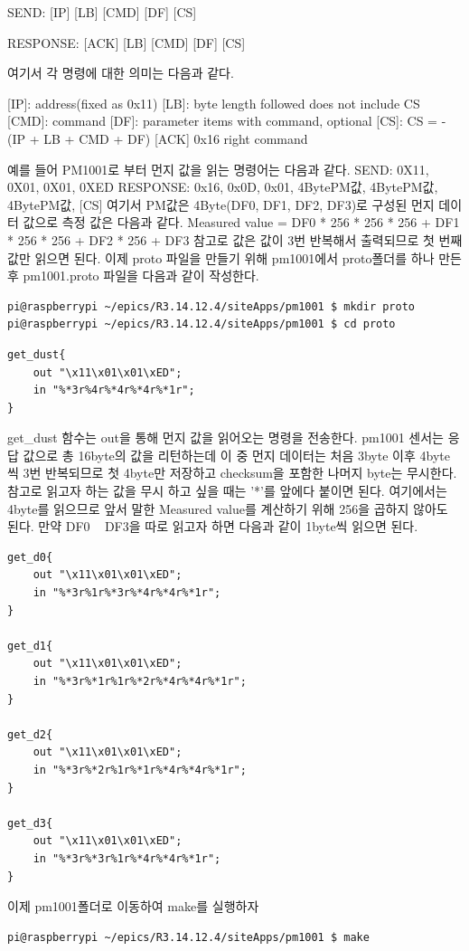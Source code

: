 \documentclass[11pt
  , a4paper
  , article
  , oneside
]{memoir}
\begin{document}
        SEND: [IP] [LB] [CMD] [DF] [CS]

        RESPONSE: [ACK] [LB] [CMD] [DF] [CS]

여기서 각 명령에 대한 의미는 다음과 같다.

        [IP]: address(fixed as 0x11)
        [LB]: byte length followed does not include CS
        [CMD]: command
        [DF]: parameter items with command, optional
        [CS]: CS = -(IP + LB + CMD + DF)
        [ACK] 0x16 right command

예를 들어 PM1001로 부터 먼지 값을 읽는 명령어는 다음과 같다.
        SEND: 0X11, 0X01, 0X01, 0XED
        RESPONSE: 0x16, 0x0D, 0x01, 4BytePM값, 4BytePM값, 4BytePM값, [CS]
여기서 PM값은 4Byte(DF0, DF1, DF2, DF3)로 구성된 먼지 데이터 값으로 측정 값은 다음과 같다.
        Measured value = DF0 * 256 * 256 * 256 + DF1 * 256 * 256 + DF2 * 256 + DF3
참고로 값은 값이 3번 반복해서 출력되므로 첫 번째 값만 읽으면 된다.
이제 proto 파일을 만들기 위해 pm1001에서 proto폴더를 하나 만든 후 pm1001.proto 파일을 다음과 같이 작성한다.
\begin{lstlisting}[style=termstyle]
pi@raspberrypi ~/epics/R3.14.12.4/siteApps/pm1001 $ mkdir proto
pi@raspberrypi ~/epics/R3.14.12.4/siteApps/pm1001 $ cd proto
\end{lstlisting}
\begin{lstlisting}[style=termstyle]
get_dust{
	out "\x11\x01\x01\xED";
	in "%*3r%4r%*4r%*4r%*1r";
}
\end{lstlisting}
get\_dust 함수는 out을 통해 먼지 값을 읽어오는 명령을 전송한다. pm1001 센서는 응답 값으로 총 16byte의 
값을 리턴하는데 이 중 먼지 데이터는 처음 3byte 이후 4byte 씩 3번 반복되므로 첫 4byte만 저장하고 
checksum을 포함한 나머지 byte는 무시한다. 참고로 읽고자 하는 값을 무시 하고 싶을 때는 '*'를 앞에다
붙이면 된다. 여기에서는 4byte를 읽으므로 앞서 말한 Measured value를 계산하기 위해 256을 곱하지 않아도 
된다. 만약 DF0 ~ DF3을 따로 읽고자 하면 다음과 같이 1byte씩 읽으면 된다. 
\begin{lstlisting}[style=termstyle]
get_d0{
	out "\x11\x01\x01\xED";
	in "%*3r%1r%*3r%*4r%*4r%*1r";
}

get_d1{
	out "\x11\x01\x01\xED";
	in "%*3r%*1r%1r%*2r%*4r%*4r%*1r";
}

get_d2{
	out "\x11\x01\x01\xED";
	in "%*3r%*2r%1r%*1r%*4r%*4r%*1r";
}

get_d3{
	out "\x11\x01\x01\xED";
	in "%*3r%*3r%1r%*4r%*4r%*1r";
}
\end{lstlisting}
이제 pm1001폴더로 이동하여 make를 실행하자
\begin{lstlisting}[style=termstyle]
pi@raspberrypi ~/epics/R3.14.12.4/siteApps/pm1001 $ make
\end{lstlisting}
\end{document}
